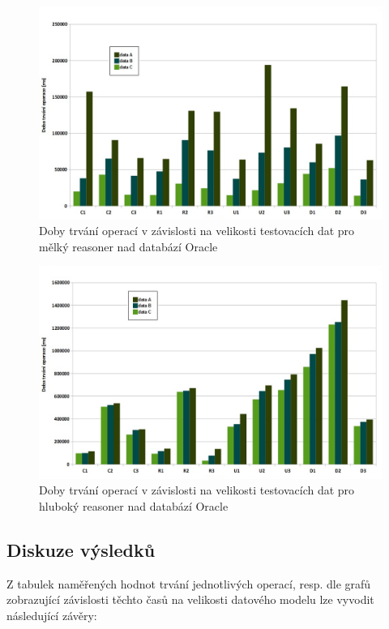 \documentclass{projekt}
\begin{document}
\begin{figure}[htb!]
\begin{center}
\includegraphics[scale=0.45]{oracleShallow.jpg}
\caption{Doby trvání operací v závislosti na velikosti testovacích dat pro mělký reasoner nad databází Oracle}
\end{center}
\end{figure}


\begin{figure}[htb!]
\begin{center}
\includegraphics[scale=0.45]{oracleDeep.jpg}
\caption{Doby trvání operací v závislosti na velikosti testovacích dat pro hluboký reasoner nad databází Oracle}
\end{center}
\end{figure}

\newpage



\subsection{Diskuze výsledků}
\hspace{0.65cm}Z tabulek naměřených hodnot trvání jednotlivých operací, resp. dle grafů zobrazující závislosti těchto časů na velikosti datového modelu lze vyvodit následující závěry:
\end{document}
